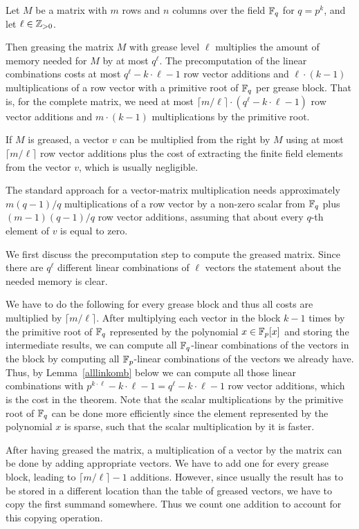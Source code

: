 \begin{Theo}
\label{theogrease}
Let $M$ be a matrix with $m$ rows and $n$ columns over the field\/ $\mathbb{F}_q$
for $q = p^k$, and let $\ell \in \mathbb{Z}_{> 0}$.

Then greasing the matrix $M$ with grease level $\ell$ multiplies the amount
of memory needed for $M$ by at most $q^\ell$. The precomputation of the
linear combinations costs at most 
$q^\ell-k\cdot \ell -1$ row vector additions 
and $\ell \cdot (k-1)$ multiplications of a row vector with a primitive
root of\/ $\mathbb{F}_q$ per grease block. That is, for the complete matrix, we
need at most $\lceil m/\ell \rceil \cdot (q^\ell-k\cdot \ell -1)$ row
vector additions and $m \cdot (k-1)$ multiplications by the primitive
root.

If $M$ is greased, a vector $v$ can be multiplied from the right by $M$
using at most $\lceil m/\ell \rceil$ row vector additions plus the 
cost of extracting the finite field elements from the vector $v$, which
is usually negligible.

The standard approach for a vector-matrix multiplication needs 
approximately $m(q-1)/q$ multiplications of a row vector by a non-zero
scalar from\/ $\mathbb{F}_q$ plus $(m-1)(q-1)/q$ row vector additions, assuming that 
about every $q$-th element of $v$ is equal to zero.
\end{Theo}
\Proof We first discuss the precomputation step to compute the greased
matrix. Since there are $q^\ell$ different linear combinations of $\ell$ 
vectors the statement about the needed memory is clear.

We have to do the following for every grease block and thus 
all costs are multiplied by $\lceil m/\ell \rceil$. 
After multiplying each vector in the
block $k-1$ times by the primitive root of $\mathbb{F}_q$ represented by the
polynomial $x \in \mathbb{F}_p[x]$ and storing the intermediate results, 
we can compute all $\mathbb{F}_q$-linear combinations
of the vectors in the block by computing all $\mathbb{F}_p$-linear combinations
of the vectors we already have. Thus, by Lemma~\ref{alllinkomb} below we can
compute all those linear combinations with 
$p^{k\cdot \ell} - k\cdot \ell - 1 = 
q^\ell - k \cdot \ell - 1$ row vector additions, which is the cost in the
theorem. Note that the scalar multiplications by the
primitive root of\/ $\mathbb{F}_q$ can be done
more efficiently since the element represented by the polynomial $x$
is sparse, such that the scalar multiplication by it is faster.

After having greased the matrix, a multiplication of a vector by 
the matrix can be done by adding appropriate vectors. We have to add
one for every grease block, leading to $\lceil m/\ell \rceil - 1$ additions.
However, since usually the result has to be stored in a different location
than the table of greased vectors, we have to copy the first summand
somewhere. Thus we count one addition to account for this copying operation.
\ProofEnd

